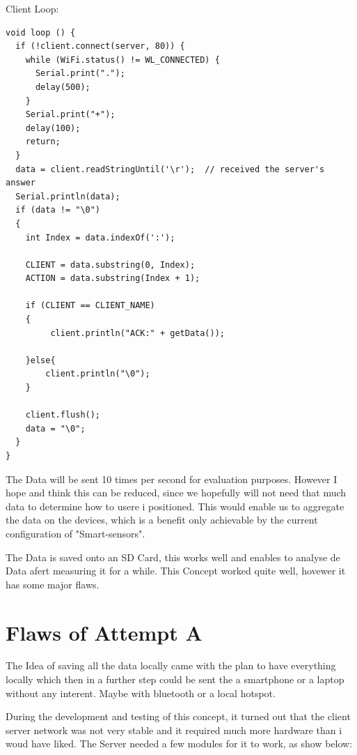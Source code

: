 Client Loop:

\begin{lstlisting}
void loop () {
  if (!client.connect(server, 80)) {
    while (WiFi.status() != WL_CONNECTED) {
      Serial.print(".");
      delay(500);
    }
    Serial.print("+");
    delay(100);
    return;
  }
  data = client.readStringUntil('\r');  // received the server's answer
  Serial.println(data);
  if (data != "\0")
  {
    int Index = data.indexOf(':');

    CLIENT = data.substring(0, Index);
    ACTION = data.substring(Index + 1);

    if (CLIENT == CLIENT_NAME)
    {
         client.println("ACK:" + getData());
      
    }else{
        client.println("\0");
    }

    client.flush();
    data = "\0";
  }
}
\end{lstlisting}

The Data will be sent 10 times per second for evaluation purposes. 
However I hope and think this can be reduced, since we hopefully will not need that much data to determine how to usere i positioned. This would enable us to aggregate the data on the devices, which is a benefit only achievable by the current configuration of "Smart-sensors".

The Data is saved onto an SD Card, this works well and enables to analyse de Data afert measuring it for a while. This Concept worked quite well, hovewer it has some major flaws. 

\section{Flaws of Attempt A}

The Idea of saving all the data locally came with the plan to have everything locally which then in a further step could be sent the a smartphone or a laptop without any interent. Maybe with bluetooth or a local hotspot. 

During the development and testing of this concept, it turned out that the client server network was not very stable and it required much more hardware than i woud have liked. 
The Server needed a few modules for it to work, as show below:

